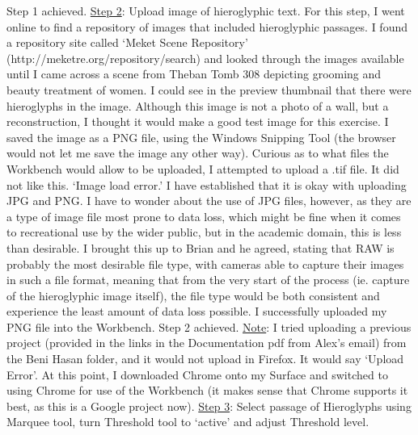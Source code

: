 \documentclass{article}
\begin{document}
\newline \break \noindent
Step 1 achieved.
\newline \break \noindent
\underline{Step 2}: Upload image of hieroglyphic text.
\newline \break \noindent
For this step, I went online to find a repository of images that included hieroglyphic passages. I found a repository site called `Meket Scene Repository' (http://meketre.org/repository/search) and looked through the images available until I came across a scene from Theban Tomb 308 depicting grooming and beauty treatment of women. I could see in the preview thumbnail that there were hieroglyphs in the image. Although this image is not a photo of a wall, but a reconstruction, I thought it would make a good test image for this exercise. I saved the image as a PNG file, using the Windows Snipping Tool (the browser would not let me save the image any other way). Curious as to what files the Workbench would allow to be uploaded, I attempted to upload a .tif file. It did not like this. `Image load error.' I have established that it is okay with uploading JPG and PNG. I have to wonder about the use of JPG files, however, as they are a type of image file most prone to data loss, which might be fine when it comes to recreational use by the wider public, but in the academic domain, this is less than desirable. I brought this up to Brian and he agreed, stating that RAW is probably the most desirable file type, with cameras able to capture their images in such a file format, meaning that from the very start of the process (ie. capture of the hieroglyphic image itself), the file type would be both consistent and experience the least amount of data loss possible. I successfully uploaded my PNG file into the Workbench.
\newline \break \noindent
Step 2 achieved.
\newline \break \noindent
\underline{Note}: I tried uploading a previous project (provided in the links in the Documentation pdf from Alex's email) from the Beni Hasan folder, and it would not upload in Firefox. It would say `Upload Error'. At this point, I downloaded Chrome onto my Surface and switched to using Chrome for use of the Workbench (it makes sense that Chrome supports it best, as this is a Google project now).
\newline \break \noindent
\underline{Step 3}: 
Select passage of Hieroglyphs using Marquee tool, turn Threshold tool to `active' and adjust Threshold level.
\newline \break
\end{document}
